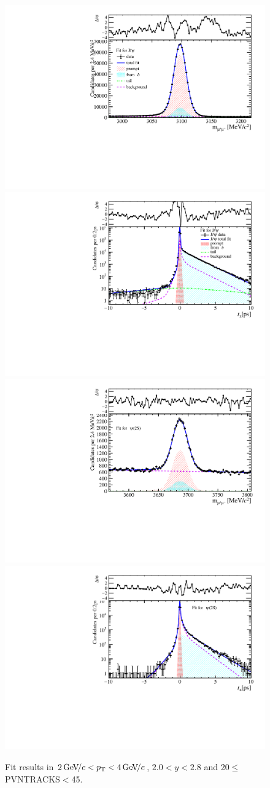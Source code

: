 \begin{figure}[H]
\begin{center}
\includegraphics[width=0.47\linewidth]{pdf/Jpsi/drawmass/n2y1pt2.pdf}
\includegraphics[width=0.47\linewidth]{pdf/Jpsi/2DFit/n2y1pt2.pdf}
\vspace*{-0.5cm}
\includegraphics[width=0.47\linewidth]{pdf/Psi2S/drawmass/n2y1pt2.pdf}
\includegraphics[width=0.47\linewidth]{pdf/Psi2S/2DFit/n2y1pt2.pdf}
\vspace*{-0.5cm}
\end{center}
\caption{Fit results in $2\text{\,Ge\kern -0.1em V\!/}c<p_{\mathrm{T}}<4\text{\,Ge\kern -0.1em V\!/}c$, $2.0<y<2.8$ and 20$\leq$PVNTRACKS$<$45.}
\label{Fitn2y1pt2}
\end{figure}
